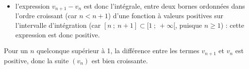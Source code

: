 \documentclass[10pt]{article}
\begin{document}
\begin{enumerate}
\begin{itemize}
		\item l'expression $v_{n+1} - v_n$ est donc l'intégrale, entre deux bornes ordonnées dans l'ordre croissant (car $n < n+1$) d'une fonction à valeurs positives sur l'intervalle d'intégration (car $[n ~;~ n+1] \subset [1 ~;~ +\infty[$, puisque $n\geqslant 1$) : cette expression est donc positive.

\end{itemize}
	Pour un $n$ quelconque supérieur à 1, la différence entre les termes $v_{n+1}$ et $v_n$ est positive, donc la suite $\left(v_n\right)$ est bien croissante.
\end{enumerate}
\end{document}
